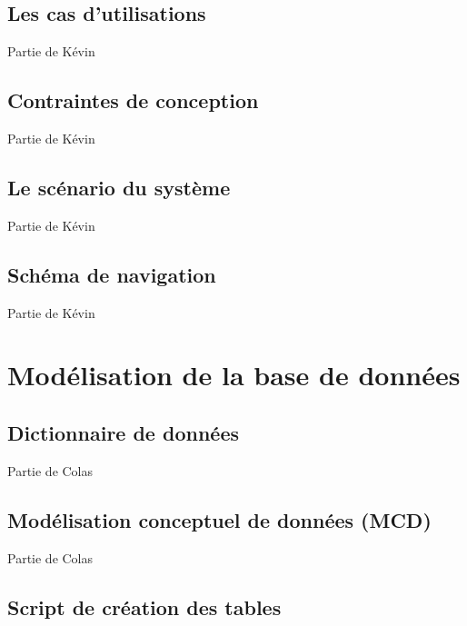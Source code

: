 \documentclass[11pt]{article}
\begin{document}
\subsection{Les cas d'utilisations}

Partie de Kévin
\subsection{Contraintes de conception}

Partie de Kévin
\subsection{Le scénario du système}

Partie de Kévin
\subsection{Schéma de navigation}

Partie de Kévin


\newpage

\section{Modélisation de la base de données}

\subsection{Dictionnaire de données}

Partie de Colas

\subsection{Modélisation conceptuel de données (MCD)}

Partie de Colas

\subsection{Script de création des tables}


\end{document}
